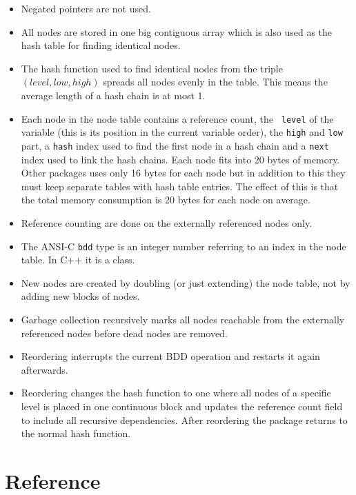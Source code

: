 \documentclass[a4paper,11pt,twoside,fleqn,openright]{report}
\begin{document}
\begin{itemize}
\item Negated pointers are not used.

\item All nodes are stored in one big contiguous array which is also used
  as the hash table for finding identical nodes.
  
\item The hash function used to find identical nodes from the triple
  $(level, low, high)$ spreads all nodes evenly in the table. This means
  the average length of a hash chain is at most 1.
  
\item Each node in the node table contains a reference count, the {\tt
    level} of the variable (this is its position in the current
  variable order), the {\tt high} and {\tt low} part, a {\tt hash}
  index used to find the first node in a hash chain and a {\tt next}
  index used to link the hash chains. Each node fits into 20 bytes of
  memory. Other packages uses only 16 bytes for each node but in
  addition to this they must keep separate tables with hash table
  entries. The effect of this is that the total memory consumption is
  20 bytes for each node on average.

\item Reference counting are done on the externally referenced nodes only.

\item The ANSI-C {\tt bdd} type is an integer number referring to an
  index in the node table. In C++ it is a class.
  
\item New nodes are created by doubling (or just extending) the node
  table, not by adding new blocks of nodes.

\item Garbage collection recursively marks all nodes reachable from the
  externally referenced nodes before dead nodes are removed.

\item Reordering interrupts the current BDD operation and restarts it
  again afterwards.
  
\item Reordering changes the hash function to one where all nodes of a
  specific level is placed in one continuous block and updates the reference
  count field to include all recursive dependencies. After reordering
  the package returns to the normal hash function.
\end{itemize}

\chapter{Reference}

\noindent




\printindex
\end{document}
